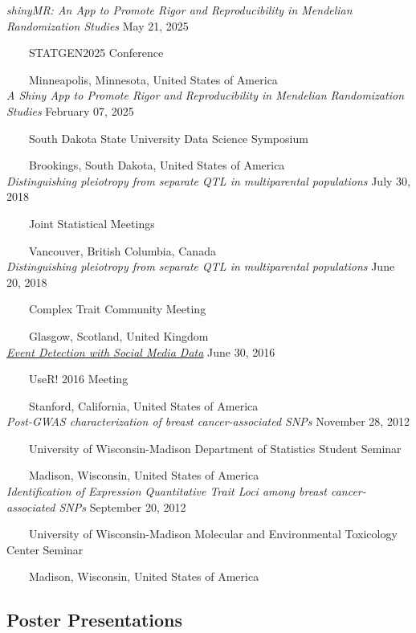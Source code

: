 \documentclass[
  10pt,
]
{article}
\begin{document}
\normalsize \textit{shinyMR: An App to Promote Rigor and Reproducibility in Mendelian Randomization Studies}
\hfill May 21, 2025\\
\strut ~~~~STATGEN2025 Conference\\
\strut ~~~~Minneapolis, Minnesota, United States of America\\
\normalsize \textit{A Shiny App to Promote Rigor and Reproducibility in Mendelian Randomization Studies}
\hfill February 07, 2025\\
\strut ~~~~South Dakota State University Data Science Symposium\\
\strut ~~~~Brookings, South Dakota, United States of America\\
\normalsize \textit{Distinguishing pleiotropy from separate QTL in multiparental populations}
\hfill July 30, 2018\\
\strut ~~~~Joint Statistical Meetings\\
\strut ~~~~Vancouver, British Columbia, Canada\\
\normalsize \textit{Distinguishing pleiotropy from separate QTL in multiparental populations}
\hfill June 20, 2018\\
\strut ~~~~Complex Trait Community Meeting\\
\strut ~~~~Glasgow, Scotland, United Kingdom\\
\normalsize \href{https://figshare.com/articles/Event_Detection_with_Social_Media_Data/3545477}{\textit{Event Detection with Social Media Data}}
\hfill June 30, 2016\\
\strut ~~~~UseR! 2016 Meeting\\
\strut ~~~~Stanford, California, United States of America\\
\normalsize \textit{Post-GWAS characterization of breast cancer-associated SNPs}
\hfill November 28, 2012\\
\strut ~~~~University of Wisconsin-Madison Department of Statistics
Student Seminar\\
\strut ~~~~Madison, Wisconsin, United States of America\\
\normalsize \textit{Identification of Expression Quantitative Trait Loci among breast cancer-associated SNPs}
\hfill September 20, 2012\\
\strut ~~~~University of Wisconsin-Madison Molecular and Environmental
Toxicology Center Seminar\\
\strut ~~~~Madison, Wisconsin, United States of America

\subsection{Poster Presentations}\label{poster-presentations}
\end{document}
